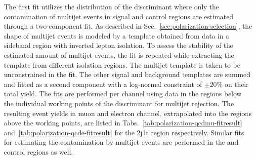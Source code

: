 The first fit utilizes the distribution of the \bdtqcd discriminant where only the contamination of multijet events in signal and control regions are estimated through a two-component fit. As described in Sec.~\ref{sec:polarization-selection}, the shape of multijet events is modeled by a template obtained from data in a sideband region with inverted lepton isolation. To assess the stability of the estimated amount of multijet events, the fit is repeated while extracting the template from different isolation regions. The multijet template is taken to be unconstrained in the fit. The other signal and background templates are summed and fitted as a second component with a log-normal constraint of $\pm20\%$ on their total yield. The fits are performed per channel using data in the regions below the individual working points of the \bdtqcd discriminant for multijet rejection. The resulting event yields in muon and electron channel, extrapolated into the regions above the working points, are listed in Tabs.~\ref{tab:polarization-qcdmu-fitresult} and~\ref{tab:polarization-qcde-fitresult} for the 2j1t region respectively. Similar fits for estimating the contamination by multijet events are performed in the \wjets and \ttbar control regions as well.



